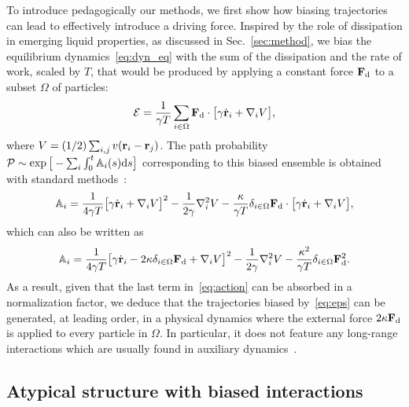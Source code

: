 \documentclass[superscriptaddress, twocolumn, prx, longbibliography, nofootinbib]{revtex4-1}
\begin{document}
To introduce pedagogically our methods, we first show how biasing trajectories can lead to effectively introduce a driving force. Inspired by the role of dissipation in emerging liquid properties, as discussed in Sec.~\ref{sec:method}, we bias the equilibrium dynamics~\eqref{eq:dyn_eq} with the sum of the dissipation and the rate of work, scaled by $T$, that would be produced by applying a constant force ${\bf F}_{\rm d}$ to a subset $\Omega$ of particles:
\begin{equation}\label{eq:eps}
	{\cal E} = \frac{1}{\gamma T}\sum_{i\in\Omega} {\bf F}_{\rm d}\cdot\big[ \gamma\dot{\bf r}_i + \nabla_i V \big] ,
\end{equation}
where $V=(1/2)\sum_{i,j}v({\bf r}_i-{\bf r}_j)$. The path probability ${\cal P}\sim\exp\big[-\sum_i\int_0^t{\mathbb A}_i(s){\rm d}s\big]$ corresponding to this biased ensemble is obtained with standard methods~\cite{Martin1973, Dominicis1975}:
\begin{equation}\label{eq:action_exp}
	{\mathbb A}_i = \frac{1}{4\gamma T} \big[\gamma\dot{\bf r}_i + \nabla_iV\big]^2 - \frac{1}{2\gamma} \nabla^2_iV - \frac{\kappa}{\gamma T} \delta_{i\in\Omega} {\bf F}_{\rm d} \cdot\big[ \gamma\dot{\bf r}_i + \nabla_i V \big] ,
\end{equation}
which can also be written as
\begin{equation}\label{eq:action}
	{\mathbb A}_i = \frac{1}{4\gamma T} \big[\gamma\dot{\bf r}_i - 2\kappa\delta_{i\in\Omega}{\bf F}_{\rm d} + \nabla_iV\big]^2 - \frac{1}{2\gamma} \nabla^2_iV - \frac{\kappa^2}{\gamma T}\delta_{i\in\Omega}{\bf F}_{\rm d}^2 .
\end{equation}
As a result, given that the last term in~\eqref{eq:action} can be absorbed in a normalization factor, we deduce that the trajectories biased by~\eqref{eq:eps} can be generated, at leading order, in a physical dynamics where the external force $2\kappa{\bf F}_{\rm d}$ is applied to every particle in $\Omega$. In particular, it does not feature any long-range interactions which are usually found in auxiliary dynamics~\cite{Jack2015}.




\subsection{Atypical structure with biased interactions}
\end{document}

